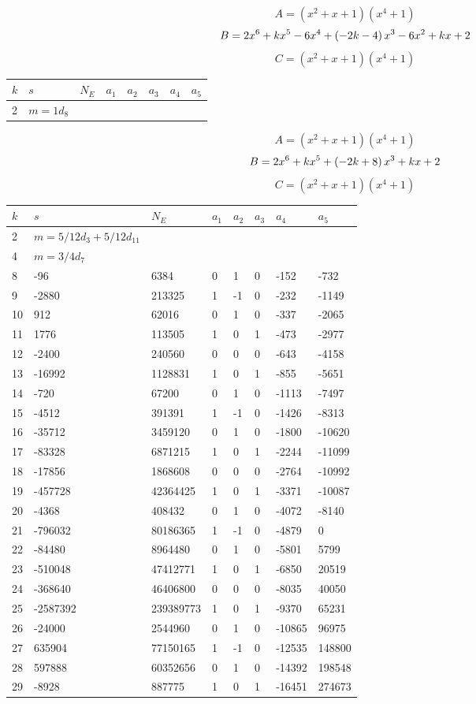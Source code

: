 \documentclass{amsart}
\begin{document}
$$A=(x^2
 + x
 + 1)(x^4
 + 1)$$
$$B=2\*x^6
 + k\*x^5
 - 6\*x^4
 + \left(-2\*k
 - 4\right) \*x^3
 - 6\*x^2
 + k\*x
 + 2$$
$$C=(x^2
 + x
 + 1)(x^4
 + 1)$$
\begin{longtable}{|l|l|l|lllll|}
\hline
$k$ & $s$ & $N_E$ & $a_1$ & $a_2$ & $a_3$ & $a_4$ & $a_5$\\
\hline
2&$m=1d_{8}$&&\multicolumn{5}{c|}{}\\
\hline
\end{longtable}
$$A=(x^2
 + x
 + 1)(x^4
 + 1)$$
$$B=2\*x^6
 + k\*x^5
 + \left(-2\*k
 + 8\right) \*x^3
 + k\*x
 + 2$$
$$C=(x^2
 + x
 + 1)(x^4
 + 1)$$
\begin{longtable}{|l|l|l|lllll|}
\hline
$k$ & $s$ & $N_E$ & $a_1$ & $a_2$ & $a_3$ & $a_4$ & $a_5$\\
\hline
2&$m=5/12d_{3}+5/12d_{11}$&&\multicolumn{5}{c|}{}\\
4&$m=3/4d_{7}$&&\multicolumn{5}{c|}{}\\
8&-96&6384&0&1&0&-152&-732\\
9&-2880&213325&1&-1&0&-232&-1149\\
10&912&62016&0&1&0&-337&-2065\\
11&1776&113505&1&0&1&-473&-2977\\
12&-2400&240560&0&0&0&-643&-4158\\
13&-16992&1128831&1&0&1&-855&-5651\\
14&-720&67200&0&1&0&-1113&-7497\\
15&-4512&391391&1&-1&0&-1426&-8313\\
16&-35712&3459120&0&1&0&-1800&-10620\\
17&-83328&6871215&1&0&1&-2244&-11099\\
18&-17856&1868608&0&0&0&-2764&-10992\\
19&-457728&42364425&1&0&1&-3371&-10087\\
20&-4368&408432&0&1&0&-4072&-8140\\
21&-796032&80186365&1&-1&0&-4879&0\\
22&-84480&8964480&0&1&0&-5801&5799\\
23&-510048&47412771&1&0&1&-6850&20519\\
24&-368640&46406800&0&0&0&-8035&40050\\
25&-2587392&239389773&1&0&1&-9370&65231\\
26&-24000&2544960&0&1&0&-10865&96975\\
27&635904&77150165&1&-1&0&-12535&148800\\
28&597888&60352656&0&1&0&-14392&198548\\
29&-8928&887775&1&0&1&-16451&274673\\

\end{longtable}
\end{document}
